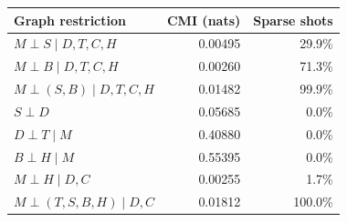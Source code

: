 \begin{tabular}{lrr}
\toprule
Graph restriction & CMI (nats) & Sparse shots\\
\midrule
$M\perp S\mid D,T,C,H$ & 0.00495 & 29.9\%\\
$M\perp B\mid D,T,C,H$ & 0.00260 & 71.3\%\\
$M\perp(S,B)\mid D,T,C,H$ & 0.01482 & 99.9\%\\
$S\perp D$ & 0.05685 & 0.0\%\\
$D\perp T\mid M$ & 0.40880 & 0.0\%\\
$B\perp H\mid M$ & 0.55395 & 0.0\%\\
$M\perp H\mid D,C$ & 0.00255 & 1.7\%\\
$M\perp(T,S,B,H)\mid D,C$ & 0.01812 & 100.0\%\\
\bottomrule
\end{tabular}
